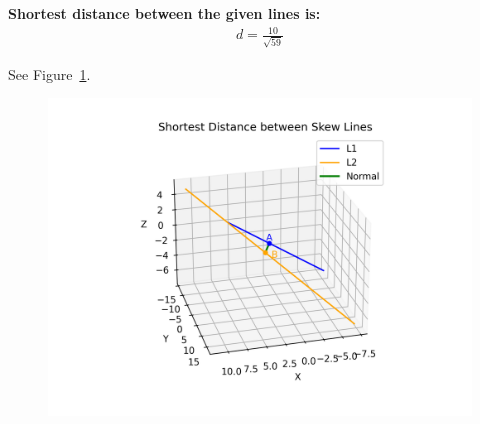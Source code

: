 \documentclass[journal]{IEEEtran}
\begin{document}
\vspace{1em}
\noindent
\textbf{Shortest distance between the given lines is:} \\
\begin{align}
    d = \frac{10}{\sqrt{59}}
\end{align}



See Figure~\ref{fig:3DVectors}.

\begin{figure}[h!]
    \centering
    \includegraphics[width=1.2\linewidth]{figs/fig.png}
    \caption{}
    \label{fig:3DVectors}
\end{figure}
\end{document}
